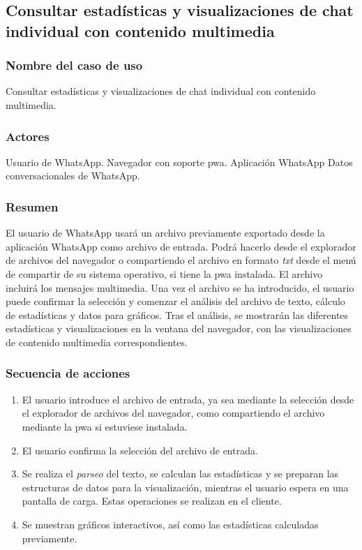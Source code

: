 \subsection{Consultar estadísticas y visualizaciones de chat individual con contenido multimedia}

\subsubsection{Nombre del caso de uso} Consultar estadísticas y visualizaciones de chat individual con contenido multimedia.

\subsubsection{Actores}

Usuario de WhatsApp.
Navegador con soporte \acrfull{pwa}.
Aplicación WhatsApp
Datos conversacionales de WhatsApp.

\subsubsection{Resumen} El usuario de WhatsApp usará un archivo previamente exportado desde la aplicación WhatsApp como archivo de entrada. Podrá hacerlo desde el explorador de archivos del navegador o compartiendo el archivo en formato \textit{txt} desde el menú de compartir de su sistema operativo, si tiene la \acrfull{pwa} instalada. El archivo incluirá los mensajes multimedia. Una vez el archivo se ha introducido, el usuario puede confirmar la selección y comenzar el análisis del archivo de texto, cálculo de estadísticas y datos para gráficos. Tras el análisis, se mostrarán las diferentes estadísticas y visualizaciones en la ventana del navegador, con las visualizaciones de contenido multimedia correspondientes.

\subsubsection{Secuencia de acciones}

\begin{enumerate}
	\item El usuario introduce el archivo de entrada, ya sea mediante la selección desde el explorador de archivos del navegador, como compartiendo el archivo mediante la \acrshort{pwa} si estuviese instalada.
	\item El usuario confirma la selección del archivo de entrada.
	\item Se realiza el \textit{parseo} del texto, se calculan las estadísticas y se preparan las estructuras de datos para la visualización, mientras el usuario espera en una pantalla de carga. Estas operaciones se realizan en el cliente.
	\item Se muestran gráficos interactivos, así como las estadísticas calculadas previamente.
\end{enumerate}

